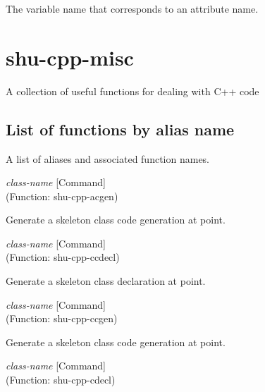 \begin{doc-string}
The variable name that corresponds to an attribute name.
\end{doc-string}

\section{shu-cpp-misc}


A collection of useful functions for dealing with C++ code


\subsection{List of functions by alias name}

A list of aliases and associated function names.



\vspace{1em}
\noindent
{}
\usebox{\funcname}\emph{class-name}
 \hfill [Command]\\%
 (Function: shu-cpp-acgen)

\begin{doc-string}
Generate a skeleton class code generation at point.
\end{doc-string}

\vspace{1em}
\noindent
{}
\usebox{\funcname}\emph{class-name}
 \hfill [Command]\\%
 (Function: shu-cpp-ccdecl)

\begin{doc-string}
Generate a skeleton class declaration at point.
\end{doc-string}

\vspace{1em}
\noindent
{}
\usebox{\funcname}\emph{class-name}
 \hfill [Command]\\%
 (Function: shu-cpp-ccgen)

\begin{doc-string}
Generate a skeleton class code generation at point.
\end{doc-string}

\vspace{1em}
\noindent
{}
\usebox{\funcname}\emph{class-name}
 \hfill [Command]\\%
 (Function: shu-cpp-cdecl)

